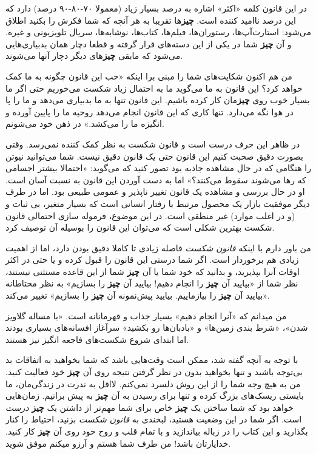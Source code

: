در این قانون کلمه «اکثر» اشاره به درصد بسیار زیاد (معمولا ۷۰-۸۰-۹۰ درصد)
دارد که این درصد ناامید کننده است. \textbf{چیز}ها تقریبا به هر آنچه که
شما فکرش را بکنید اطلاق می‌شود: استارت‌آپ‌ها، رستوران‌ها، فیلم‌ها،
کتاب‌ها، نوشابه‌ها، سریال تلویزیونی و غیره. و آن \textbf{چیز} شما در یکی
از این دسته‌های قرار گرفته و قطعا دچار همان بدبیاری‌هایی می‌شود که مابقی
\textbf{چیز}های دیگر دچار آنها می‌شوند.

من هم اکنون شکایت‌های شما را مبنی برا اینکه «خب این قانون چگونه به ما
کمک خواهد کرد؟ این قانون به ما می‌گوید ما به احتمال زیاد شکست می‌خوریم
حتی اگر ما بسیار خوب روی \textbf{چیز}مان کار کرده باشیم. این قانون تنها
به ما بدبیاری می‌دهد و ما را پا در هوا نگه می‌دارد. تنها کاری که این
قانون انجام می‌دهد روحیه ما را پایین آورده و انگیزه ما را می‌کشد.» در
ذهن خود می‌شونم.

در ظاهر این حرف درست است و قانون شکست به نظر کمک کننده نمی‌رسد. وقتی
بصورت دقیق صحبت کنیم این قانون حتی یک قانون دقیق نیست. شما می‌توانید
نیوتن را هنگامی که در حال مشاهده جاذبه بود تصور کنید که می‌گوید:
«احتمالا بیشتر اجسامی که رها می‌شوند سقوط می‌کنند؟» اما به دست آوردن این
قانون به نسبت آسان است. او در حال بررسی و مشاهده یک قانون تغییر ناپذیر و
عمومی طبیعی بود. اما در طرف دیگر موفقیت بازار یک محصول مرتبط با رفتار
انسانی است که بسیار متغیر، بی ثبات و (و در اغلب موارد) غیر منطقی است. در
این موضوع، فرموله سازی احتمالی قانون شکست بهترین شکلی است که می‌توان این
قانون را بوسیله آن توصیف کرد.

من باور دارم با اینکه \emph{قانون شکست} فاصله زیادی تا کاملا دقیق بودن
دارد، اما از اهمیت زیادی هم برخوردار است. اگر شما درستی این قانون را
قبول کرده و یا حتی در اکثر اوقات آنرا بپذیرید، و بدانید که خود شما یا آن
\textbf{چیز} شما از این قاعده مستثنی نیستند، نظر شما از «بیایید آن
\textbf{چیز} را انجام دهیم! بیایید آن \textbf{چیز} را بسازیم» به نظر
محتاطانه «بیایید آن \textbf{چیز} را بیازماییم. بیایید پیش‌نمونه آن
\textbf{چیز} را بسازیم» تغییر می‌کند.

من میدانم که «آنرا انجام دهیم» بسیار جذاب و قهرمانانه است. «با مساله
گلاویز شدن»، «شرط بندی زمین‌ها» و «بادبان‌ها رو بکشید» سرآغاز افسانه‌های
بسیاری بودند اما ابتدای شروع شکست‌های فاجعه انگیز نیز هستند.

با توجه به آنچه گفته شد، ممکن است وقت‌هایی باشد که شما بخواهید به
اتفاقات بد بی‌توجه باشید و تنها بخواهید بدون در نظر گرفتن نتیجه روی آن
\textbf{چیز} خود فعالیت کنید. من به هیچ وجه شما را از این روش دلسرد
نمی‌کنم. لااقل به ندرت در زندگی‌مان، ما بایستی ریسک‌های بزرگ کرده و تنها
برای رسیدن به آن \textbf{چیز} به پیش برانیم. زمان‌هایی خواهد بود که شما
ساختن یک \textbf{چیز} خاص برای شما مهم‌تر از داشتن یک \textbf{چیز}
\emph{درست} است. اگر شما در این وضعیت هستید، لبخندی به \emph{قانون شکست}
بزنید، احتیاط را کنار بگذارید و این کتاب را در زباله بیاندازید و با تمام
قلب و روح خود روی آن \textbf{چیز} کار کنید. خدایارتان باشد! من طرف شما
هستم و آرزو میکنم موفق شوید.

